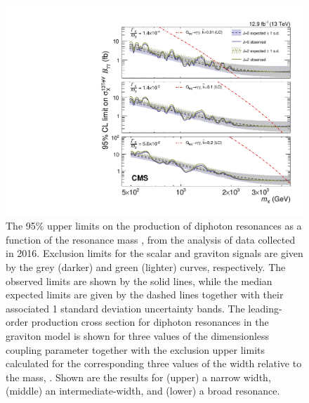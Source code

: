 \begin{figure}[!htb]
    \centering
    \includegraphics[width=\cmsFigMedWidth]{Figure_002.pdf}
    \caption{
      The 95\% \CL upper limits on the production of diphoton resonances as a
      function of the resonance mass \mX, from the analysis of data collected in 2016.
      Exclusion limits for the scalar and \RS graviton signals are given by the grey (darker) and
      green (lighter) curves, respectively.  The observed limits are shown by the solid lines,
      while the median expected limits are given by the dashed lines together with their
      associated 1 standard deviation uncertainty bands.  The leading-order production cross
      section for diphoton resonances in the \RS graviton model is shown for three values of the
      dimensionless coupling parameter \ktild together with the exclusion upper limits
      calculated for the corresponding three values of the width relative to the mass, \GammaOm.
      Shown are the results for (upper) a narrow width, (middle) an intermediate-width, and
      (lower) a broad resonance.
      \label{fig:limits}
    }
\end{figure}

